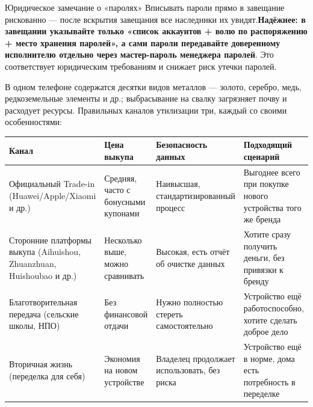 \begin{tcbwarn}{Юридическое замечание о «паролях»}
Вписывать пароли прямо в завещание рискованно — после вскрытия завещания все наследники их увидят.\textbf{Надёжнее: в завещании указывайте только «список аккаунтов + волю по распоряжению + место хранения паролей», а сами пароли передавайте доверенному исполнителю отдельно через мастер-пароль менеджера паролей}. Это соответствует юридическим требованиям и снижает риск утечки паролей.

\end{tcbwarn}


В одном телефоне содержатся десятки видов металлов — золото, серебро, медь, редкоземельные элементы и др.; выбрасывание на свалку загрязняет почву и расходует ресурсы. Правильных каналов утилизации три, каждый со своими особенностями:

\begin{center}
\begin{tabularx}{\linewidth}{|X|X|X|X|}
\hline
\textbf{Канал} & \textbf{Цена выкупа} & \textbf{Безопасность данных} & \textbf{Подходящий сценарий} \tabularnewline
\hline
Официальный Trade-in (Huawei/Apple/Xiaomi и др.) & Средняя, часто с бонусными купонами & Наивысшая, стандартизированный процесс & Выгоднее всего при покупке нового устройства того же бренда \tabularnewline
Сторонние платформы выкупа (Aihuishou, Zhuanzhuan, Huishoubao и др.) & Несколько выше, можно сравнивать & Высокая, есть отчёт об очистке данных & Хотите сразу получить деньги, без привязки к бренду \tabularnewline
Благотворительная передача (сельские школы, НПО) & Без финансовой отдачи & Нужно полностью стереть самостоятельно & Устройство ещё работоспособно, хотите сделать доброе дело \tabularnewline
Вторичная жизнь (переделка для себя) & Экономия на новом устройстве & Владелец продолжает использовать, без риска & Устройство ещё в норме, дома есть потребность в переделке \tabularnewline
\hline
\end{tabularx}
\end{center}

